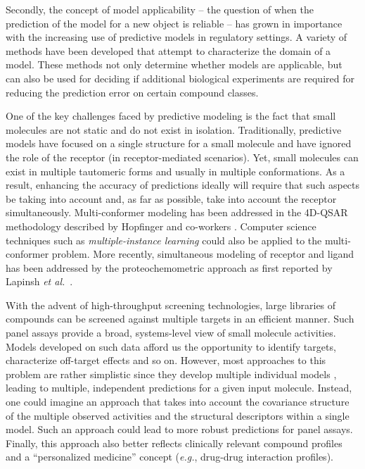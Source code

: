 \documentclass{sig-alternate}
\begin{document}
Secondly, the concept of model applicability -- the question of when
the prediction of the model for a new object is reliable -- has grown
in importance with the increasing use of predictive models in
regulatory settings. A variety of methods have been developed that
attempt to characterize the domain of a model. These methods not only
determine whether models are applicable, but can also be used for
deciding if additional biological experiments are required for
reducing the prediction error on certain compound classes.

One of the key challenges faced by predictive modeling is the fact
that small molecules are not static and do not exist in
isolation. Traditionally, predictive models have focused on a single
structure for a small molecule and have ignored the role of the
receptor (in receptor-mediated scenarios). Yet, small molecules can
exist in multiple tautomeric forms and usually in multiple
conformations. As a result, enhancing the accuracy of predictions
ideally will require that such aspects be taking into account and, as
far as possible, take into account the receptor
simultaneously. Multi-conformer modeling has been addressed in the
4D-QSAR methodology described by Hopfinger and co-workers
\cite{Albuquerque:1998ys}.  Computer science techniques such as
\emph{multiple-instance learning} could also be applied to the
multi-conformer problem. More recently, simultaneous modeling of
receptor and ligand has been addressed by the proteochemometric
approach as first reported by Lapinsh \textit{et
  al.}~\cite{lapinsh2001}.

With the advent of high-throughput screening technologies, large
libraries of compounds can be screened against multiple targets in an
efficient manner. Such panel assays provide a broad, systems-level
view of small molecule activities.  Models developed on such data
afford us the opportunity to identify targets, characterize off-target
effects and so on. However, most approaches to this problem are rather
simplistic since they develop multiple individual models
\cite{Chen:2010zr}, leading to multiple, independent predictions for a
given input molecule.  Instead, one could imagine an approach that
takes into account the covariance structure of the multiple observed
activities and the structural descriptors within a single model. Such
an approach could lead to more robust predictions for panel
assays. Finally, this approach also better reflects clinically
relevant compound profiles~\cite{kuhn2010} and a ``personalized
medicine'' concept (\emph{e.g.}, drug-drug interaction profiles).
\end{document}
